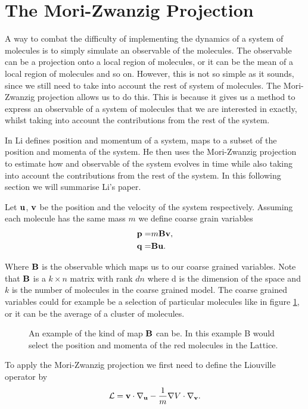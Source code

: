\section{The Mori-Zwanzig Projection}
A way to combat the difficulty of implementing the dynamics of a system of molecules is to simply simulate an observable of the molecules. The observable can be a projection onto a local region of molecules, or it can be the mean of a local region of molecules and so on. However, this is not so simple as it sounds, since we still need to take into account the rest of system of molecules. The Mori-Zwanzig projection allows us to do this. This is because it gives us a method to express an observable of a system of molecules that we are interested in exactly, whilst taking into account the contributions from the rest of the system. 

In \citep{Li2010} Li defines position and momentum of a system, maps to a subset of the position and momenta of the system. He then uses the Mori-Zwanzig projection to estimate how and observable of the system evolves in time while also taking into account the contributions from the rest of the system. In this following section we will summarise Li's paper.

Let $\mathbf{u}$, $\mathbf{v}$ be the position and the velocity of the system respectively. Assuming each molecule has the same mass $m$ we define coarse grain variables
\begin{align*}
\mathbf{p} =& m\mathbf{B}\mathbf{v},\\
\mathbf{q} =& \mathbf{B}\mathbf{u}.
\end{align*}

Where $\mathbf{B}$ is the observable which maps us to our coarse grained variables. Note that $\mathbf{B}$ is a $k\times n$ matrix with rank $dn$ where d is the dimension of the space and $k$ is the number of molecules in the coarse grained model. The coarse grained variables could for example be a selection of particular molecules like in figure \ref{figure:2}, or it can be the average of a cluster of molecules.

\begin{figure}[h]\label{figure:2}
\centering
\def\svgscale{0.35}

\caption{An example of the kind of map $\mathbf{B}$ can be. In this example B would select the position and momenta of the red molecules in the Lattice. }
\end{figure}

To apply the Mori-Zwanzig projection we first need to define the Liouville operator by
\begin{align*}
\mathbf{\mathcal{L}} = \mathbf{v} \cdot \nabla_{\mathbf{u}} - \frac{1}{m}\nabla V \cdot\nabla_{\mathbf{v}}.
\end{align*}

